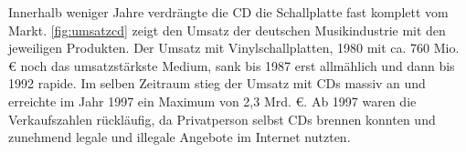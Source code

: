 Innerhalb weniger Jahre verdrängte die CD die Schallplatte fast komplett vom
Markt. \autoref{fig:umsatzcd} zeigt den Umsatz der deutschen Musikindustrie mit
den jeweiligen Produkten. Der Umsatz mit Vinylschallplatten, 1980 mit ca. 760
Mio. \euro{} noch das umsatzstärkste Medium, sank bis 1987 erst all­mäh­lich und
dann bis 1992 rapide. Im selben Zeitraum stieg der Umsatz mit CDs massiv an und
erreichte im Jahr 1997 ein Maximum von 2,3 Mrd. \euro. Ab 1997 waren die
Verkaufszahlen rückläufig, da Privatperson selbst CDs \glqq brennen\grqq{}
konnten und zunehmend legale und illegale Angebote im Internet nutzten.

